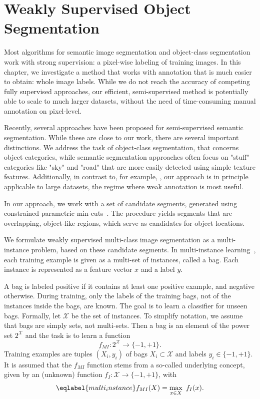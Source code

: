 \chapter{Weakly Supervised Object Segmentation}\label{ch:semi_supervised}

Most algorithms for semantic image segmentation and object-class segmentation
work with strong supervision: a pixel-wise labeling of training images. In this
chapter, we investigate a method that works with annotation that is much
easier to obtain: whole image labels.
While we do not reach the accuracy of competing fully supervised approaches,
our efficient, semi-supervised method is potentially able to scale to much
larger datasets, without the need of time-consuming manual annotation on
pixel-level.

Recently, several approaches have been proposed for semi-supervised semantic
segmentation.  While these are close to our work, there are several important
distinctions.  We address the task of object-class segmentation, that concerns
object categories, while semantic segmentation approaches often focus on
"stuff" categories like "sky" and "road" that are more easily detected using
simple texture features.
Additionally, in contrast to, for example, \citet{vezhnevets2011weakly}, our approach is in
principle applicable to large datasets, the regime where weak annotation is
most useful.

In our approach, we work with a set of candidate segments, generated using
constrained parametric min-cuts~\citep{carreira2010constrained}.  The procedure yields
segments that are overlapping, object-like regions, which serve as candidates
for object locations.

We formulate weakly supervised multi-class image segmentation as a
multi-instance problem, based on these candidate segments.  In multi-instance
learning~\citep{dietterich1997solving}, each training example is given as a
multi-set of instances, called a bag.  Each instance is represented as a
feature vector $x$ and a label $y$.

A bag is labeled positive if it contains at least one positive example, and
negative otherwise.  During training, only the labels of the training bags, not
of the instances inside the bags, are known.  The goal is to learn a classifier
for unseen bags. 
Formally, let $\mathcal{X}$ be the set of instances. To simplify notation, we
assume that bags are simply sets, not multi-sets.  Then a bag is an element of
the power set $2^\mathcal{X}$ and the task is to learn a function
\begin{equation} f_{MI} \colon 2^\mathcal{X} \rightarrow \{-1,+1\}.  \end{equation}
Training examples are tuples $(X_i,y_i)$ of bags $X_i \subset \mathcal{X}$ and
labels $y_i \in \{-1,+1\}$.  It is assumed that the $f_{MI}$ function stems
from a so-called underlying concept, given by an (unknown) function
$f_{I} \colon \mathcal{X} \rightarrow \{-1,+1\}$, with 
\begin{equation}\eqlabel{multi_instance}
f_{MI}(X)= \max_{x \in X}\ f_{I}(x).
\end{equation}

